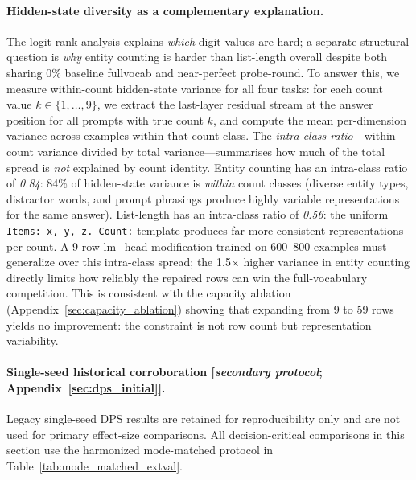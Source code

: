 \documentclass{article}
\begin{document}
\paragraph{Hidden-state diversity as a complementary explanation.}
The logit-rank analysis explains \emph{which} digit values are hard; a separate structural question is \emph{why} entity counting is harder than list-length overall despite both sharing 0\% baseline fullvocab and near-perfect probe-round.
To answer this, we measure within-count hidden-state variance for all four tasks: for each count value $k \in \{1,\ldots,9\}$, we extract the last-layer residual stream at the answer position for all prompts with true count $k$, and compute the mean per-dimension variance across examples within that count class.
The \emph{intra-class ratio}---within-count variance divided by total variance---summarises how much of the total spread is \emph{not} explained by count identity.
Entity counting has an intra-class ratio of \emph{0.84}: 84\% of hidden-state variance is \emph{within} count classes (diverse entity types, distractor words, and prompt phrasings produce highly variable representations for the same answer).
List-length has an intra-class ratio of \emph{0.56}: the uniform \texttt{Items: x, y, z. Count:} template produces far more consistent representations per count.
A 9-row lm\_head modification trained on 600--800 examples must generalize over this intra-class spread; the 1.5$\times$ higher variance in entity counting directly limits how reliably the repaired rows can win the full-vocabulary competition.
This is consistent with the capacity ablation (Appendix~\ref{sec:capacity_ablation}) showing that expanding from 9 to 59 rows yields no improvement: the constraint is not row count but representation variability.

\paragraph{Single-seed historical corroboration [\textit{secondary protocol}; Appendix~\ref{sec:dps_initial}].}
Legacy single-seed DPS results are retained for reproducibility only and are not used
for primary effect-size comparisons. All decision-critical comparisons in this section
use the harmonized mode-matched protocol in Table~\ref{tab:mode_matched_extval}.
\end{document}
